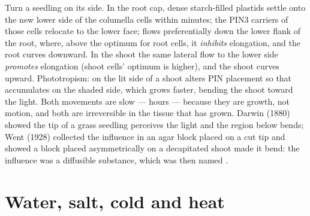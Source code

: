 \begin{example}\label{ex:b3:plant-molecular-physiology:tropism}
Turn a seedling on its side. In the root cap, dense starch-filled
plastids settle onto the new lower side of the columella cells within
minutes; the PIN3 carriers of those cells relocate to the lower face;
 flows preferentially down the lower flank of the root, where,
above the optimum for root cells, it \emph{inhibits} elongation, and
the root curves downward. In the shoot the same lateral flow to the
lower side \emph{promotes} elongation (shoot cells' optimum is higher),
and the shoot curves upward. Phototropism:  on the lit side
of a shoot alters PIN placement so that  accumulates on the shaded
side, which grows faster, bending the shoot toward the light. Both
movements are slow --- hours --- because they are growth, not motion,
and both are irreversible in the tissue that has grown. Darwin (1880)
showed the tip of a grass seedling perceives the light and the region
below bends; Went (1928) collected the influence in an agar block placed
on a cut tip and showed a block placed asymmetrically on a decapitated
shoot made it bend: the influence was a diffusible substance, which
was then named .
\end{example}

\section{Water, salt, cold and heat}

